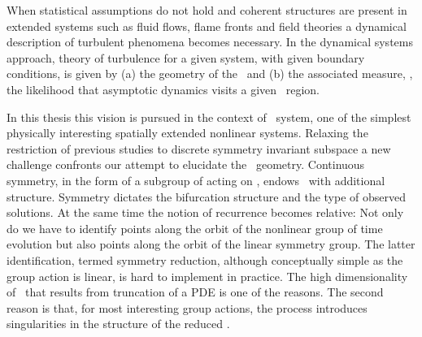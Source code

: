 
When statistical assumptions do not hold and coherent
structures are present in extended systems
such as fluid flows, flame fronts and field theories
a dynamical description of turbulent phenomena becomes
necessary.
In the dynamical systems approach,
theory of turbulence for a given system, with given boundary conditions,
is given by (a) the geometry of the \statesp\ and (b) the associated measure,
\ie, the likelihood that asymptotic dynamics visits a given \statesp\ region.

In this thesis this vision is pursued in the context of \KS\
system, one of the simplest physically interesting spatially
extended nonlinear systems. Relaxing the restriction of
previous studies to discrete
symmetry invariant subspace a new challenge confronts our
attempt to elucidate the \statesp\ geometry. Continuous
symmetry, in the form of a subgroup of  acting on
\statesp, endows \statesp\ with additional structure.
Symmetry dictates the bifurcation structure and the type of
observed solutions. At the same time the notion of recurrence becomes
relative: Not only do we have to identify points along the
orbit of the nonlinear group of time evolution but also points
along the orbit of the linear symmetry group. The latter
identification, termed symmetry reduction, although
conceptually simple as the group action is linear, is hard to
implement in practice. The high dimensionality of \statesp\
that results from truncation of a PDE is one of the reasons.
The second reason is that, for most interesting group actions,
the process introduces singularities in the structure of the
reduced \statesp.


